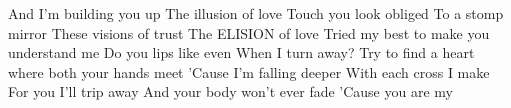


And I'm building you up
The illusion of love
Touch you look obliged
To a stomp mirror
These visions of trust
The ELISION of love
Tried my best to make you understand me
Do you lips like even
When I turn away?
Try to find a heart where both your hands meet
'Cause I'm falling deeper
With each cross I make
For you I'll trip away
And your body won't ever fade
'Cause you are my

%


